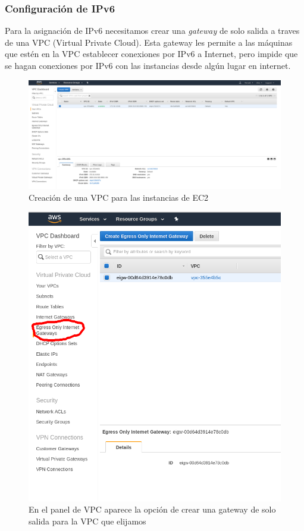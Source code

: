\documentclass[9pt]{article}
\begin{document}
\subsubsection*{Configuración de IPv6}
Para la asignación de IPv6 necesitamos crear una \textit{gateway} de solo salida a traves de una \textsf{VPC} (Virtual Private Cloud). Esta gateway les permite a las máquinas que estén en la VPC establecer conexiones por IPv6 a Internet, pero impide que se hagan conexiones por IPv6 con las instancias desde algún lugar en internet.
\\
\begin{figure}[H]
  \centering
  \includegraphics[width=0.8\linewidth]{vpc}
  \caption{Creación de una VPC para las instancias de EC2}
\end{figure}
\begin{figure}
  \centering
  \includegraphics[width=0.8\linewidth]{vpc_egress_onlyv2}
  \caption{En el panel de VPC aparece la opción de crear una gateway de solo salida para la VPC que elijamos}
\end{figure}
\end{document}
